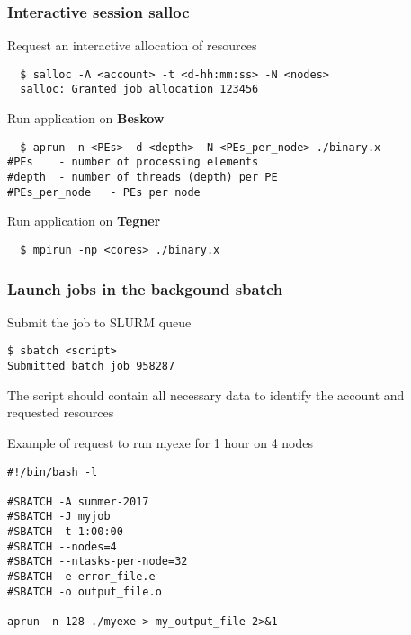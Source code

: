 \begin{frame}[fragile]
\frametitle{Interactive session \hfill \alert{\textbf{salloc}}}

\begin{exampleblock}{Request an interactive allocation of resources}
  \begin{verbatim}
  $ salloc -A <account> -t <d-hh:mm:ss> -N <nodes>
  salloc: Granted job allocation 123456
   \end{verbatim}
\end{exampleblock}

\begin{exampleblock}{Run application on \alert{\textbf{Beskow}}}
  \begin{verbatim}
  $ aprun -n <PEs> -d <depth> -N <PEs_per_node> ./binary.x
#PEs 	- number of processing elements
#depth 	- number of threads (depth) per PE
#PEs_per_node 	- PEs per node
  \end{verbatim}
\end{exampleblock}
  
  
\begin{exampleblock}{Run application on \alert{\textbf{Tegner}}}

  \begin{verbatim}
  $ mpirun -np <cores> ./binary.x
  \end{verbatim}
\end{exampleblock}
\end{frame}

\begin{frame}[fragile]
\frametitle{Launch jobs in the backgound \hfill  \alert{\textbf{sbatch}}}
\begin{exampleblock}{Submit the job to SLURM queue}
  \begin{verbatim}
$ sbatch <script>
Submitted batch job 958287
  \end{verbatim}
\end{exampleblock}

\scriptsize
The script should contain all necessary data to identify the account and requested resources 
\begin{exampleblock}{Example of request to run myexe for 1 hour on 4 nodes}
  \begin{verbatim}
#!/bin/bash -l

#SBATCH -A summer-2017
#SBATCH -J myjob
#SBATCH -t 1:00:00
#SBATCH --nodes=4
#SBATCH --ntasks-per-node=32
#SBATCH -e error_file.e
#SBATCH -o output_file.o

aprun -n 128 ./myexe > my_output_file 2>&1
  \end{verbatim}
\end{exampleblock}

\end{frame}

